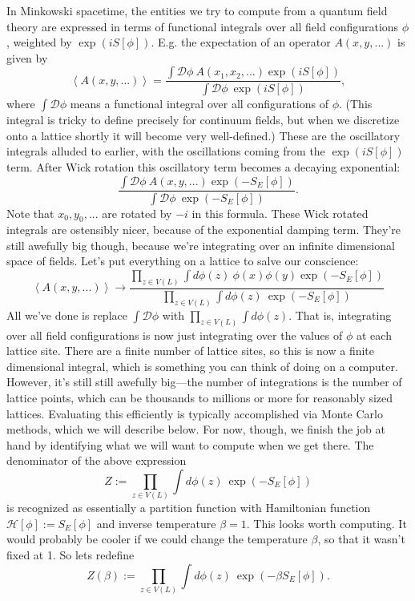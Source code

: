 \documentclass[9pt,twocolumn,twoside]{article}
\begin{document}
In Minkowski spacetime, the entities we try to compute from a quantum field theory are expressed in terms of functional integrals over all field configurations $\phi$, weighted by $\exp(i S[\phi])$.  E.g. the expectation of an operator $A(x,y,...)$ is given by
\[\left<A(x,y,...)\right> = \frac{\int \mathcal{D}\phi \: A(x_1,x_2,...) \exp(i S[\phi])}{\int \mathcal{D}\phi \: \exp(i S[\phi])}, \]
where $\int \mathcal{D}\phi$ means a functional integral over all configurations of $\phi$.  (This integral is tricky to define precisely for continuum fields, but when we discretize onto a lattice shortly it will become very well-defined.)  These are the oscillatory integrals alluded to earlier, with the oscillations coming from the $\exp(i S[\phi])$ term.  After Wick rotation this oscillatory term becomes a decaying exponential:
\[\frac{\int \mathcal{D}\phi \: A(x,y,...) \exp(-S_E[\phi])}{\int \mathcal{D}\phi \: \exp(-S_E[\phi])}.\]
Note that $x_0,y_0,...$ are rotated by $-i$ in this formula.  These Wick rotated integrals are ostensibly nicer, because of the exponential damping term.  They're still awefully big though, because we're integrating over an infinite dimensional space of fields.  Let's put everything on a lattice to salve our conscience:
\[ \left<A(x,y,...)\right> \rightarrow \frac{\prod_{z\in V(L)}\int d\phi(z) \: \phi(x)\phi(y) \exp(-S_E[\phi])}{\prod_{z\in V(L)}\int d\phi(z) \: \exp(-S_E[\phi])}\]
All we've done is replace $\int \mathcal{D}\phi$ with $\prod_{z\in V(L)}\int d\phi(z)$.  That is, integrating over all field configurations is now just integrating over the values of $\phi$ at each lattice site.  There are a finite number of lattice sites, so this is now a finite dimensional integral, which is something you can think of doing on a computer.  However, it's still still awefully big---the number of integrations is the number of lattice points, which can be thousands to millions or more for reasonably sized lattices.  Evaluating this efficiently is typically accomplished via Monte Carlo methods, which we will describe below.  For now, though, we finish the job at hand by identifying what we will want to compute when we get there.  The denominator of the above expression
\[Z := \prod_{z\in V(L)}\int d\phi(z) \: \exp(-S_E[\phi])\]
is recognized as essentially a partition function with Hamiltonian function $\mathcal{H}[\phi] := S_E[\phi]$ and inverse temperature $\beta=1$.  This looks worth computing.  It would probably be cooler if we could change the temperature $\beta$, so that it wasn't fixed at 1.  So lets redefine
\[Z(\beta) := \prod_{z\in V(L)}\int d\phi(z) \: \exp(-\beta S_E[\phi]).\]
\end{document}
